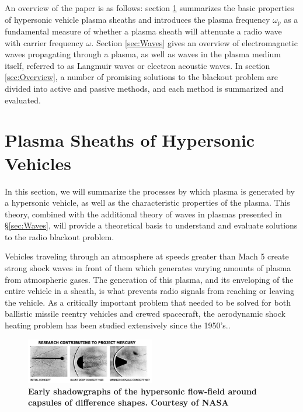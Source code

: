 \documentclass[twocolumn]{article}
\begin{document}
	An overview of the paper is as follows: section \ref{sec:PlasmaSheaths} summarizes the basic properties of hypersonic vehicle plasma sheaths and introduces the plasma frequency $\omega_p$ as a fundamental measure of whether a plasma sheath will attenuate a radio wave with carrier frequency $\omega$.
	Section \ref{sec:Waves} gives an overview of electromagnetic waves propagating through a plasma, as well as waves in the plasma medium itself, referred to as Langmuir waves or electron acoustic waves.
	In section \ref{sec:Overview}, a number of promising solutions to the blackout problem are divided into active and passive methods, and each method is summarized and evaluated.
	
\section{Plasma Sheaths of Hypersonic Vehicles} \label{sec:PlasmaSheaths}
In this section, we will summarize the processes by which plasma is generated by a hypersonic vehicle, as well as the characteristic properties of the plasma.
This theory, combined with the additional theory of waves in plasmas presented in \S\ref{sec:Waves}, will provide a theoretical basis to understand and evaluate solutions to the radio blackout problem.

Vehicles traveling through an atmosphere at speeds greater than Mach 5 create strong shock waves in front of them which generates varying amounts of plasma from atmospheric gases.
The generation of this plasma, and its enveloping of the entire vehicle in a sheath, is what prevents radio signals from reaching or leaving the vehicle.
As a critically important problem that needed to be solved for both ballistic missile reentry vehicles and crewed spacecraft, the aerodynamic shock heating problem has been studied extensively since the 1950's.\cite{allen_study_1958}\cite{dunn_theoretical_1973}\cite{allen_aerodynamic_1964}\cite{launius_coming_2012}.

\begin{figure}
	\centering
	\includegraphics[width=0.5\textwidth]{Images/Shadowgraphs.jpg}
	\caption{\textbf{Early shadowgraphs of the hypersonic flow-field around capsules of difference shapes. Courtesy of NASA}}
	\label{fig:ShadowGraphs}
\end{figure}
\end{document}
